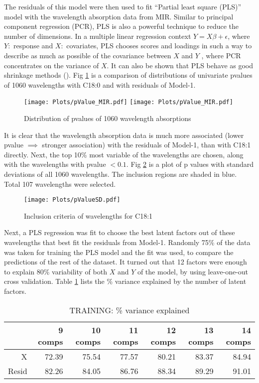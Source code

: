 The residuals of this model were then used to fit ``Partial least square (PLS)''  \cite{Mevik_Wehrens_2007_JSS} model with the wavelength absorption data from MIR. Similar to principal component regression (PCR), PLS is also a powerful technique to reduce the number of dimensions. In a multiple linear regression context $Y = X\beta + \epsilon$, where $Y:$ response and $X:$ covariates, PLS chooses scores and loadings in such a way to describe as much as possible of the covariance between $X$ and $Y$ , where PCR concentrates on the variance of $X$. It can also be shown that PLS behave as good shrinkage methods (\cite{Hastie_etal_2009_Elements}). Fig \ref{fig:pvalue18} is a comparison of distributions of univariate pvalues of 1060 wavelengths with C18:0 and with residuals of Model-1. 
\begin{figure}[H]
\begin{center}
\texttt{[image: Plots/pValue\_MIR.pdf]}
\texttt{[image: Plots/pValue\_MIR.pdf]}
\end{center}
\caption{Distribution of pvalues of 1060 wavelength absorptions}
\label{fig:pvalue18}
\end{figure}
It is clear that the wavelength absorption data is much more associated (lower pvalue $\implies$ stronger association) with the residuals of Model-1, than with C18:1 directly. Next, the top 10\% most variable of the wavelengths are chosen, along with the wavelengths with pvalue $< 0.1$. Fig \ref{fig:pvalSD18} is a plot of p values with standard deviations of all 1060 wavelengths. The inclusion regions are shaded in blue. Total 107 wavelengths were selected.
\begin{figure}[H]
\begin{center}
\texttt{[image: Plots/pValueSD.pdf]}
\end{center}
\caption{Inclusion criteria of wavelengths for C18:1}
\label{fig:pvalSD18}
\end{figure}
Next, a PLS regression was fit to choose the best latent factors out of these wavelengths that best fit the residuals from Model-1. Randomly 75\% of the data was taken for training the PLS model and the fit was used, to compare the predictions of the rest of the dataset. It turned out that 12 factors were enough to explain 80\% variability of both $X$ and $Y$ of the model, by using leave-one-out cross validation. Table \ref{Tab:plsr18} lists the \% variance explained by the number of latent factors.
\begin{table}[H]
\centering
\begin{tabular}{rrrrrrr}
  \hline
      & 9 comps & 10 comps & 11 comps & 12 comps & 13 comps & 14 comps \\
  \hline
  X   & 72.39   &  75.54   &  77.57   & 80.21    & 83.37    & 84.94 \\
Resid & 82.26   &  84.05   &  86.76   & 88.34    & 89.29    & 91.01 \\
  \hline
\end{tabular}
\caption{TRAINING: \% variance explained}
\label{Tab:plsr18}
\end{table}
